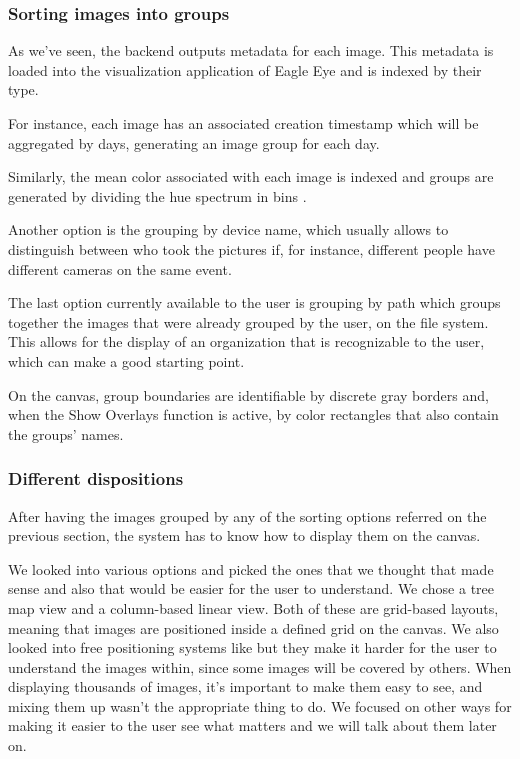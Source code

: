\subsubsection{Sorting images into groups}

As we've seen, the backend outputs metadata for each image. This metadata is loaded into the visualization application of Eagle Eye and is indexed by their type.

For instance, each image has an associated creation timestamp which will be aggregated by days, generating an image group for each day.

Similarly, the mean color associated with each image is indexed and groups are generated by dividing the hue spectrum in bins .

Another option is the grouping by device name, which usually allows to distinguish between who took the pictures if, for instance, different people have different cameras on the same event.

The last option currently available to the user is grouping by path which groups together the images that were already grouped by the user, on the file system. This allows for the display of an organization that is recognizable to the user, which can make a good starting point.

On the canvas, group boundaries are identifiable by discrete gray borders and, when the Show Overlays function is active, by color rectangles that also contain the groups' names.


\subsubsection{Different dispositions}

After having the images grouped by any of the sorting options referred on the previous section, the system has to know how to display them on the canvas.

We looked into various options  and picked the ones that we thought that made sense and also that would be easier for the user to understand. We chose a tree map view and a column-based linear view. Both of these are grid-based layouts, meaning that images are positioned inside a defined grid on the canvas. We also looked into free positioning systems like  but they make it harder for the user to understand the images within, since some images will be covered by others. When displaying thousands of images, it's important to make them easy to see, and mixing them up wasn't the appropriate thing to do. We focused on other ways for making it easier to the user see what matters and we will talk about them later on.

